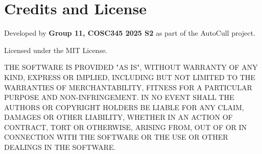 \documentclass[12pt,a4paper]{article}
\begin{document}
\section{Credits and License}

Developed by \textbf{Group 11, COSC345 2025 S2} as part of the AutoCull project.  

Licensed under the MIT License.

THE SOFTWARE IS PROVIDED "AS IS", WITHOUT WARRANTY OF ANY KIND, EXPRESS OR IMPLIED, INCLUDING BUT NOT LIMITED TO THE WARRANTIES OF MERCHANTABILITY, FITNESS FOR A PARTICULAR PURPOSE AND NON-INFRINGEMENT. IN NO EVENT SHALL THE AUTHORS OR COPYRIGHT HOLDERS BE LIABLE FOR ANY CLAIM, DAMAGES OR OTHER LIABILITY, WHETHER IN AN ACTION OF CONTRACT, TORT OR OTHERWISE, ARISING FROM, OUT OF OR IN CONNECTION WITH THE SOFTWARE OR THE USE OR OTHER DEALINGS IN THE SOFTWARE.
\end{document}
